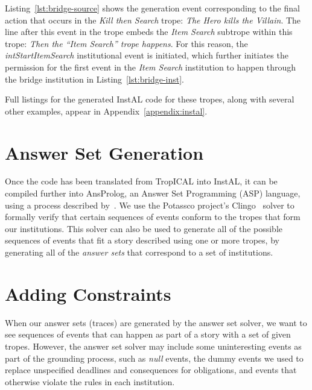 \documentclass[11pt]{report}
\begin{document}
Listing~\ref{lst:bridge-source} shows the generation event corresponding to the
final action that occurs in the \emph{Kill then Search} trope: \emph{The Hero
  kills the Villain}. The line after this event in the trope embeds the
\emph{Item Search} subtrope within this trope: \emph{Then the ``Item Search''
  trope happens}. For this reason, the \emph{intStartItemSearch} institutional
event is initiated, which further initiates the permission for the first event
in the \emph{Item Search} institution to happen through the bridge institution
in Listing~\ref{lst:bridge-inst}.

Full listings for the generated InstAL code for these tropes, along with several
other examples, appear in Appendix~\ref{appendix:instal}.

\section{Answer Set Generation}
\label{sec:t-asp}

Once the code has been translated from TropICAL into InstAL, it can be compiled
further into AnsProlog, an Answer Set Programming (ASP) language, using a
process described by~\citet{cliffe2007specifying}. We use the
Potassco project's Clingo~\citep{gebser2011potassco} solver to formally verify
that certain sequences of events conform to the tropes that form our
institutions. This solver can also be used to generate all of the possible
sequences of events that fit a story described using one or more tropes, by
generating all of the \emph{answer sets} that correspond to a set of institutions.

\section{Adding Constraints}
\label{sec:t-constraints}
When our answer sets (traces) are generated by the answer set solver, we want to
see sequences of events that can happen as part of a story with a set
of given tropes. However, the answer set solver may include some uninteresting
events as part of the grounding process, such as \emph{null} events, the dummy
events we used to replace unspecified deadlines and consequences for
obligations, and events that otherwise violate the rules in each institution.
\end{document}
